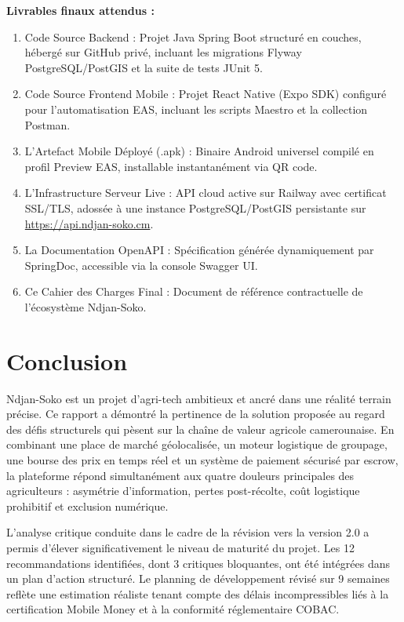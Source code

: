 \documentclass[12pt,a4paper]{report}
\begin{document}
\textbf{Livrables finaux attendus :}
\begin{enumerate}
  \item Code Source Backend : Projet Java Spring Boot structuré en couches, hébergé sur GitHub privé, incluant les migrations Flyway PostgreSQL/PostGIS et la suite de tests JUnit 5.
  \item Code Source Frontend Mobile : Projet React Native (Expo SDK) configuré pour l'automatisation EAS, incluant les scripts Maestro et la collection Postman.
  \item L'Artefact Mobile Déployé (.apk) : Binaire Android universel compilé en profil Preview EAS, installable instantanément via QR code.
  \item L'Infrastructure Serveur Live : API cloud active sur Railway avec certificat SSL/TLS, adossée à une instance PostgreSQL/PostGIS persistante sur \url{https://api.ndjan-soko.cm}.
  \item La Documentation OpenAPI : Spécification générée dynamiquement par SpringDoc, accessible via la console Swagger UI.
  \item Ce Cahier des Charges Final : Document de référence contractuelle de l'écosystème Ndjan-Soko.
\end{enumerate}

\chapter*{Conclusion}

Ndjan-Soko est un projet d'agri-tech ambitieux et ancré dans une réalité terrain précise. Ce rapport a démontré la pertinence de la solution proposée au regard des défis structurels qui pèsent sur la chaîne de valeur agricole camerounaise. En combinant une place de marché géolocalisée, un moteur logistique de groupage, une bourse des prix en temps réel et un système de paiement sécurisé par escrow, la plateforme répond simultanément aux quatre douleurs principales des agriculteurs : asymétrie d'information, pertes post-récolte, coût logistique prohibitif et exclusion numérique.

L'analyse critique conduite dans le cadre de la révision vers la version 2.0 a permis d'élever significativement le niveau de maturité du projet. Les 12 recommandations identifiées, dont 3 critiques bloquantes, ont été intégrées dans un plan d'action structuré. Le planning de développement révisé sur 9 semaines reflète une estimation réaliste tenant compte des délais incompressibles liés à la certification Mobile Money et à la conformité réglementaire COBAC.
\end{document}
